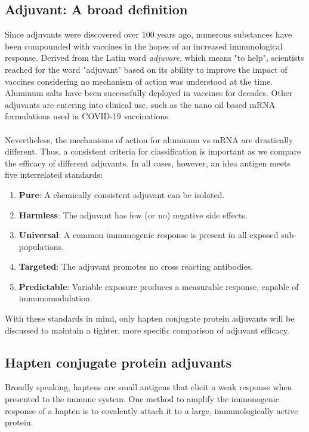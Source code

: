 \documentclass[a4paper]{article}
\begin{document}
\subsection{Adjuvant: A broad definition}
Since adjuvants were discovered over 100 years ago, numerous substances have been compounded with vaccines in the hopes of an increased immunological response. Derived from the Latin word \emph{adjuvare}, which means "to help"\cite{pmid9139482}, scientists reached for the word "adjuvant" based on its ability to improve the impact of vaccines considering no mechanism of action was understood at the time. Aluminum salts have been successfully deployed in vaccines for decades\cite{pmid27274998}. Other adjuvants are entering into clinical use, such as the nano oil based mRNA formulations used in COVID-19 vaccinations\cite{pmid33034449}. \\\\ Nevertheless, the mechanisms of action for aluminum vs mRNA are drastically different. Thus, a consistent criteria for classification is important as we compare the efficacy of different adjuvants. In all cases, however, an idea antigen meets five interrelated standards\cite{pmid24833186}: 

\begin{enumerate}
    \item \textbf{Pure}: A chemically consistent adjuvant can be isolated.
    \item \textbf{Harmless}: The adjuvant has few (or no) negative side effects.
    \item \textbf{Universal}: A common immunogenic response is present in all exposed sub-populations.
    \item \textbf{Targeted}: The adjuvant promotes no cross reacting antibodies. 
    \item \textbf{Predictable}: Variable exposure produces a measurable response, capable of immunomodulation.
\end{enumerate}

With these standards in mind, only hapten conjugate protein adjuvants will be discussed to maintain a tighter, more specific comparison of adjuvant efficacy. 
\subsection{Hapten conjugate protein adjuvants}
Broadly speaking, haptens are small antigens that elicit a weak response when presented to the immune system\cite{pmid30275080}. One method to amplify the  immonogenic response of a hapten is to covalently attach it to a large, immunologically active protein. 
\end{document}
